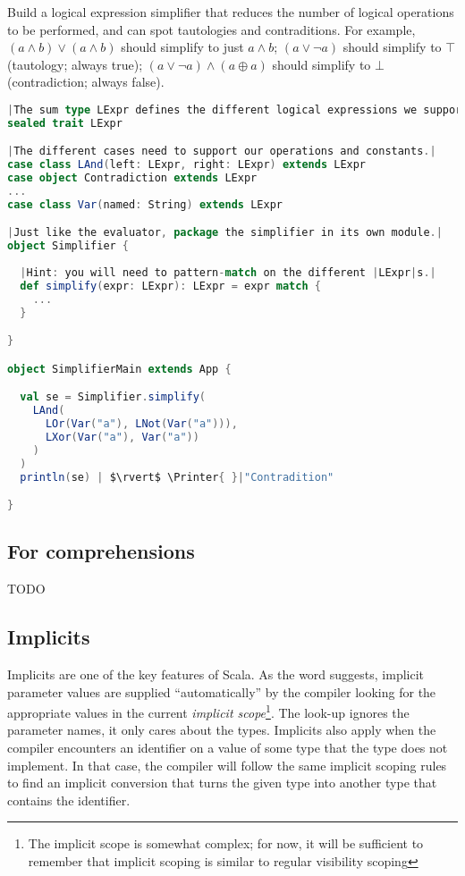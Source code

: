 \documentclass[10 pt]{article}
\begin{document}
\begin{example}
Build a logical expression simplifier that reduces the number of logical operations to be performed, and can spot tautologies and contraditions. For example, $(a \land b) \lor (a \land b)$ should simplify to just $a \land b$; $(a \lor \lnot{a})$ should simplify to $\top$ (tautology; always true); $(a \lor \lnot{a}) \land (a \oplus a)$ should simplify to $\bot$ (contradiction; always false).

\begin{lstlisting}[caption={Logical expression simplifier}, label={code:ls}, language=Scala, escapechar=|]
|The sum type LExpr defines the different logical expressions we support.|
sealed trait LExpr

|The different cases need to support our operations and constants.|
case class LAnd(left: LExpr, right: LExpr) extends LExpr
case object Contradiction extends LExpr
...
case class Var(named: String) extends LExpr

|Just like the evaluator, package the simplifier in its own module.|
object Simplifier {
    
  |Hint: you will need to pattern-match on the different |LExpr|s.|
  def simplify(expr: LExpr): LExpr = expr match {
    ...
  }

}

object SimplifierMain extends App {

  val se = Simplifier.simplify(
    LAnd(
      LOr(Var("a"), LNot(Var("a"))),
      LXor(Var("a"), Var("a"))
    )
  )
  println(se) | $\rvert$ \Printer{ }|"Contradition"

}
\end{lstlisting}
\end{example}

\subsection{For comprehensions}
TODO
 
\subsection{Implicits} 
Implicits are one of the key features of Scala. As the word suggests, implicit parameter values are supplied ``automatically'' by the compiler looking for the appropriate values in the current \emph{implicit scope}\footnote{The implicit scope is somewhat complex; for now, it will be sufficient to remember that implicit scoping is similar to regular visibility scoping}. The look-up ignores the parameter names, it only cares about the types. Implicits also apply when the compiler encounters an identifier on a value of some type that the type does not implement. In that case, the compiler will follow the same implicit scoping rules to find an implicit conversion that turns the given type into another type that contains the identifier. 
\end{document}
